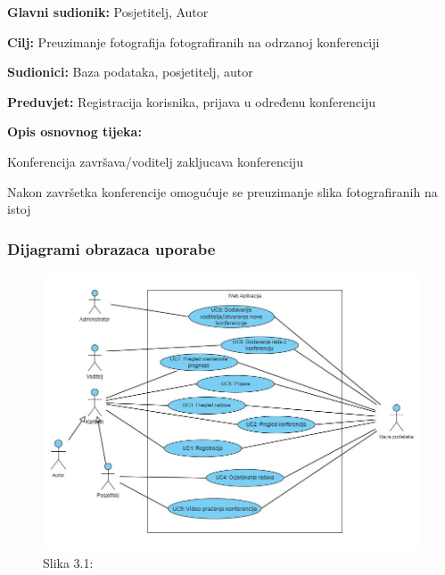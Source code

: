 					\noindent {}
					\begin{packed_item}
	
						\item \textbf{Glavni sudionik: }Posjetitelj, Autor
						\item  \textbf{Cilj:} Preuzimanje fotografija fotografiranih na odrzanoj konferenciji
						\item  \textbf{Sudionici:} Baza podataka, posjetitelj, autor
						\item  \textbf{Preduvjet:} Registracija korisnika, prijava u određenu konferenciju
						\item  \textbf{Opis osnovnog tijeka:}
						
						\item[] \begin{packed_enum}
	
							\item Konferencija završava/voditelj zakljucava konferenciju
							\item Nakon završetka konferencije omogućuje se preuzimanje slika fotografiranih na istoj
						\end{packed_enum}
						
					\end{packed_item}		
				
					
				\subsubsection{Dijagrami obrazaca uporabe}
					
		\begin{figure}[H]
			\includegraphics[scale=0.55]{slike/UML1.JPG} 
			\centering
			\caption{Slika 3.1: }
			\label{UML1}
		\end{figure}		
				
